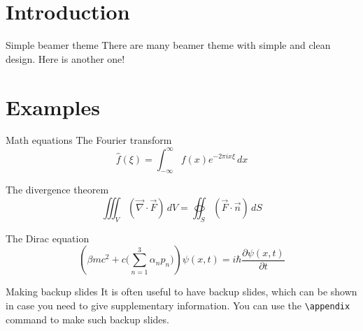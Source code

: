 \documentclass{beamer}
\title{\Naive}
\subtitle{Yet another simple beamer theme}
\author{Takahiro Ueda}
\institute{\url{https://github.com/tueda/beamertheme-naive}}
\date{30 March 2019}
\begin{document}
\maketitle

\section{Introduction}

\begin{frame}{Simple beamer theme}
  There are many beamer theme with simple and clean design.
  Here is another one!
\end{frame}

\section{Examples}

\begin{frame}{Math equations}
  The Fourier transform
  \begin{equation}
    \hat{f}(\xi) = \int_{-\infty}^\infty
      f(x) e^{-2\pi ix\xi} \, dx
  \end{equation}

  The divergence theorem
  \begin{equation}
    \iiint_V (\vec{\nabla}\cdot\vec{F}) \, dV
      = \oiint_S (\vec{F}\cdot\vec{n}) \, dS
  \end{equation}

  The Dirac equation
  \begin{equation}
    \left( \beta mc^2 + c \Biggl( \sum_{n=1}^3 \alpha_n p_n \Biggr) \right)
      \psi(x, t) = i \hbar \frac{\partial \psi(x, t)}{\partial t}
  \end{equation}
\end{frame}

\appendix

\begin{frame}[fragile]{Making backup slides}
  It is often useful to have backup slides, which can be shown in case you need
  to give supplementary information. You can use the \verb|\appendix| command
  to make such backup slides.
\end{frame}
\end{document}
